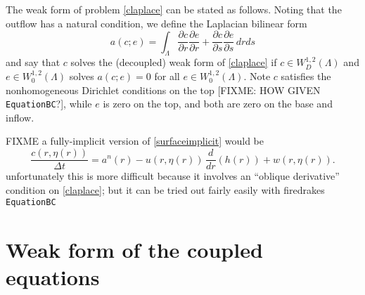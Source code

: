 \documentclass[letterpaper,final,12pt,reqno]{amsart}
\begin{document}
The weak form of problem \eqref{claplace} can be stated as follows.  Noting that the outflow has a natural condition, we define the Laplacian bilinear form
\begin{equation}
a(c;e) = \int_\Lambda \frac{\partial c}{\partial r} \frac{\partial e}{\partial r} + \frac{\partial c}{\partial s} \frac{\partial e}{\partial s}\,dr ds  \label{asurface}
\end{equation}
and say that $c$ solves the (decoupled) weak form of \eqref{claplace} if $c \in W_D^{1,2}(\Lambda)$ and $e \in W_0^{1,2}(\Lambda)$ solves $a(c;e)=0$ for all $e \in W_0^{1,2}(\Lambda)$.  Note $c$ satisfies the nonhomogeneous Dirichlet conditions on the top [FIXME: HOW GIVEN \texttt{EquationBC}?], while $e$ is zero on the top, and both are zero on the base and inflow.

FIXME a fully-implicit version of \eqref{surfaceimplicit} would be
\begin{equation}
\frac{c(r,\eta(r))}{\Delta t} = a^n(r) - u(r,\eta(r))\,\frac{d}{dr}(h(r)) + w(r,\eta(r)). \label{surfaceimplicitfully}
\end{equation}
unfortunately this is more difficult because it involves an ``oblique derivative'' condition on \eqref{claplace}; but it can be tried out fairly easily with firedrakes \texttt{EquationBC}


\section{Weak form of the coupled equations} \label{sec:weakformcoupled}
\end{document}
